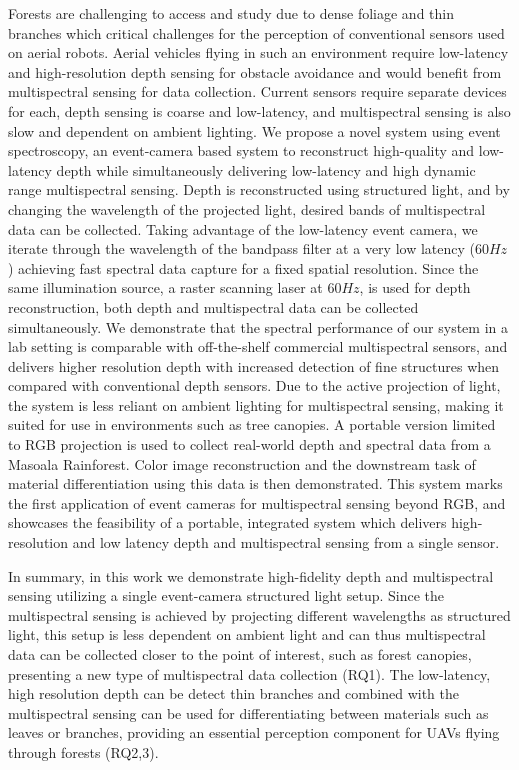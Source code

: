 Forests are challenging to access and study due to dense foliage and thin branches which critical challenges for the perception of conventional sensors used on aerial robots. Aerial vehicles flying in such an environment require low-latency and high-resolution depth sensing for obstacle avoidance and would benefit from multispectral sensing for data collection. Current sensors require separate devices for each, depth sensing is coarse and low-latency, and multispectral sensing is also slow and dependent on ambient lighting. We propose a novel system using event spectroscopy, an event-camera based system to reconstruct high-quality and low-latency depth while simultaneously delivering low-latency and high dynamic range multispectral sensing. Depth is reconstructed using structured light, and by changing the wavelength of the projected light, desired bands of multispectral data can be collected. Taking advantage of the low-latency event camera, we iterate through the wavelength of the bandpass filter at a very low latency ($60Hz$) achieving fast spectral data capture for a fixed spatial resolution. Since the same illumination source, a raster scanning laser at $60Hz$, is used for depth reconstruction, both depth and multispectral data can be collected simultaneously. We demonstrate that the spectral performance of our system in a lab setting is comparable with off-the-shelf commercial multispectral sensors, and delivers higher resolution depth with increased detection of fine structures when compared with conventional depth sensors. Due to the active projection of light, the system is less reliant on ambient lighting for multispectral sensing, making it suited for use in environments such as tree canopies. A portable version limited to RGB projection is used to collect real-world depth and spectral data from a Masoala Rainforest. Color image reconstruction and the downstream task of material differentiation using this data is then demonstrated. This system marks the first application of event cameras for multispectral sensing beyond RGB, and showcases the feasibility of a portable, integrated system which delivers high-resolution and low latency depth and multispectral sensing from a single sensor.

In summary, in this work we demonstrate high-fidelity depth and multispectral sensing utilizing a single event-camera structured light setup.
Since the multispectral sensing is achieved by projecting different wavelengths as structured light, this setup is less dependent on ambient light and can thus multispectral data can be collected closer to the point of interest, such as forest canopies, presenting a new type of multispectral data collection (RQ1). The low-latency, high resolution depth can be detect thin branches and combined with the multispectral sensing can be used for differentiating between materials such as leaves or branches, providing an essential perception component for UAVs flying through forests (RQ2,3).


